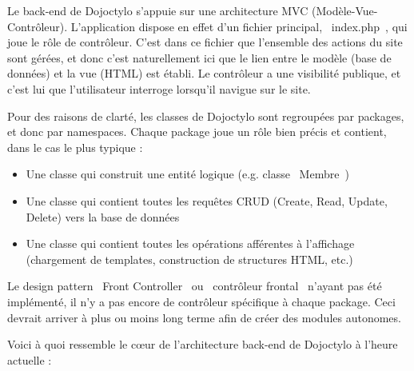 \documentclass[a4paper,12pt]{article}
\begin{document}
Le back-end de Dojoctylo s'appuie sur une architecture MVC (Modèle-Vue-Contrôleur). L'application dispose en effet d'un fichier principal, \og~index.php~\fg, qui joue le rôle de contrôleur. C'est dans ce fichier que l'ensemble des actions du site sont gérées, et donc c'est naturellement ici que le lien entre le modèle (base de données) et la vue (HTML) est établi. Le contrôleur a une visibilité publique, et c'est lui que l'utilisateur interroge lorsqu'il navigue sur le site.

Pour des raisons de clarté, les classes de Dojoctylo sont regroupées par packages, et donc par namespaces. Chaque package joue un rôle bien précis et contient, dans le cas le plus typique :

\begin{itemize}
 \item{Une classe qui construit une entité logique (e.g. classe \og~Membre~\fg)}
 \item{Une classe qui contient toutes les requêtes CRUD (Create, Read, Update, Delete) vers la base de données}
 \item{Une classe qui contient toutes les opérations afférentes à l'affichage (chargement de templates, construction de structures HTML, etc.)}
\end{itemize}

Le design pattern \og~Front Controller~\fg{} ou \og~contrôleur frontal~\fg{} n'ayant pas été implémenté, il n'y a pas encore de contrôleur spécifique à chaque package. Ceci devrait arriver à plus ou moins long terme afin de créer des modules autonomes.

Voici à quoi ressemble le c\oe ur de l'architecture back-end de Dojoctylo à l'heure actuelle :
\end{document}
